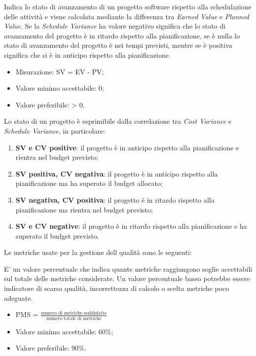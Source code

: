 		Indica lo stato di avanzamento di un progetto software rispetto alla schedulazione delle attività e viene calcolata mediante la differenza tra \textit{Earned Value} e \textit{Planned Value}.
		Se la \textit{Schedule Variance} ha valore negativo significa che lo stato di avanzamento del progetto è in ritardo rispetto alla pianificazione, se è nulla lo stato di avanzamento del progetto è nei tempi previsti, mentre se è positiva significa che si è in anticipo rispetto alla pianificazione.
		\begin{itemize}
			\item{Misurazione: SV = EV - PV;}
			\item{Valore minimo accettabile: 0;}
			\item{Valore preferibile: > 0.}
		\end{itemize}
						
		Lo stato di un progetto è esprimibile dalla correlazione tra \textit{Cost Variance} e \textit{Schedule Variance}, in particolare:
		\begin{enumerate}
			\item{\textbf{SV e CV positive}: il progetto è in anticipo rispetto alla pianificazione e rientra nel budget previsto;}
			\item{\textbf{SV positiva, CV negativa}: il progetto è in anticipo rispetto alla pianificazione ma ha superato il budget allocato;}
			\item{\textbf{SV negativa, CV positiva}: il progetto è in ritardo rispetto alla pianificazione ma rientra nel budget previsto;}
			\item{\textbf{SV e CV negative}: il progetto è in ritardo rispetto alla pianificazione e ha superato il budget previsto.}
		\end{enumerate}

	Le metriche usate per la gestione dell qualità sono le seguenti:
	
		E' un valore percentuale che indica quante metriche raggiungono soglie accettabili sul totale delle metriche considerate. Un valore percentuale basso potrebbe essere indicatore di scarsa qualità, incorrettezza di calcolo o scelta metriche poco adeguate.
		\begin{itemize}
			\item{PMS = $\displaystyle\frac{\mbox{numero di metriche soddisfatte}}{\mbox{numero totale di metriche}}$}
			\item{Valore minimo accettabile: 60\%;}
			\item{Valore preferibile: 90\%.}
		\end{itemize}
